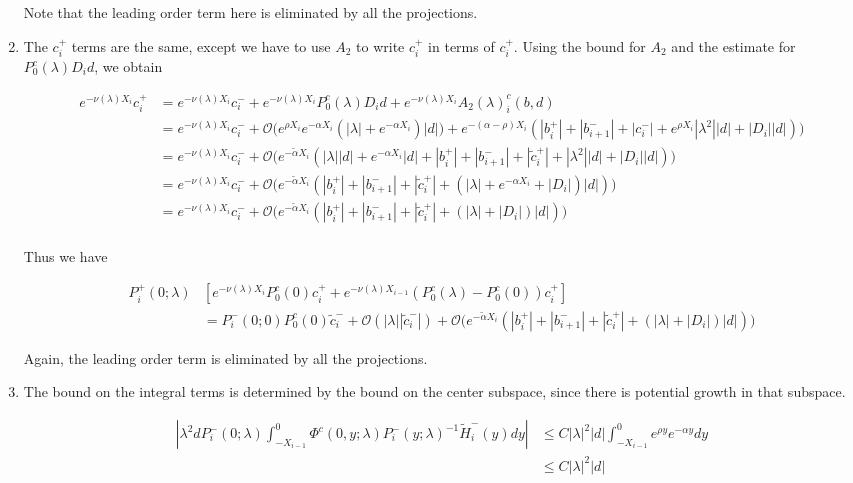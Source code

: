 \documentclass[12pt]{article}
\begin{document}
\begin{enumerate}
Note that the leading order term here is eliminated by all the projections.

\item The $c_i^+$ terms are the same, except we have to use $A_2$ to write $c_i^+$ in terms of $c_i^+$. Using the bound for $A_2$ and the estimate for $P_0^c(\lambda) D_i d$, we obtain

\begin{align*}
e^{-\nu(\lambda)X_i} c_i^+ &= e^{-\nu(\lambda)X_i} c_i^- 
+ e^{-\nu(\lambda)X_i} P_0^c(\lambda) D_i d + e^{-\nu(\lambda)X_i} A_2(\lambda)_i^c(b, d)\\
&= e^{-\nu(\lambda)X_i} c_i^- + \mathcal{O}\Big( e^{\rho X_i} e^{-\alpha X_i} ( |\lambda| + e^{-\alpha X_i} ) |d|) + e^{-(\alpha - \rho) X_i}( |b_i^+| + |b_{i+1}^-| + |c_i^-| + e^{\rho X_i}|\lambda^2||d| + |D_i||d|) \Big) \\
&= e^{-\nu(\lambda)X_i} c_i^- + \mathcal{O}\Big( e^{-\tilde{\alpha} X_i} ( |\lambda||d| + e^{-\alpha X_i} |d| + |b_i^+| + |b_{i+1}^-| + |\tilde{c}_i^+| + |\lambda^2||d| + |D_i||d|) \Big) \\
&= e^{-\nu(\lambda)X_i} c_i^- + \mathcal{O}\Big( e^{-\tilde{\alpha} X_i} ( |b_i^+| + |b_{i+1}^-| + |\tilde{c}_i^+| + (|\lambda| + e^{-\alpha X_i} + |D_i| ) |d|) \Big) \\
&= e^{-\nu(\lambda)X_i} c_i^- + \mathcal{O}\Big( e^{-\tilde{\alpha} X_i} ( |b_i^+| + |b_{i+1}^-| + |\tilde{c}_i^+| + (|\lambda| + |D_i| ) |d|) \Big) \\
\end{align*}

Thus we have

\begin{align*}
P_i^+(0; \lambda)&[ e^{-\nu(\lambda) X_i} P_0^c(0) c_i^+ + e^{-\nu(\lambda) X_{i-1}} (P_0^c(\lambda) - P_0^c(0))c_i^+] \\
&= P_i^-(0; 0) P_0^c(0) \tilde{c}_i^- + \mathcal{O}(|\lambda||\tilde{c}_i^-|)
+ \mathcal{O}\Big( e^{-\tilde{\alpha} X_i} ( |b_i^+| + |b_{i+1}^-| + |\tilde{c}_i^+| + (|\lambda| + |D_i| ) |d|) \Big)
\end{align*}

Again, the leading order term is eliminated by all the projections.

\item The bound on the integral terms is determined by the bound on the center subspace, since there is potential growth in that subspace.

\begin{align*}
\left| \lambda^2 d P_i^-(0; \lambda) \int_{-X_{i-1}}^0 \Phi^c(0, y; \lambda) P_i^-(y; \lambda)^{-1} \tilde{H}_i^-(y) dy \right| &\leq C |\lambda|^2 |d| \int_{-X_{i-1}}^0 e^{\rho y} e^{-\alpha y} dy \\
&\leq C |\lambda|^2 |d|
\end{align*}

\end{enumerate}
\end{document}
